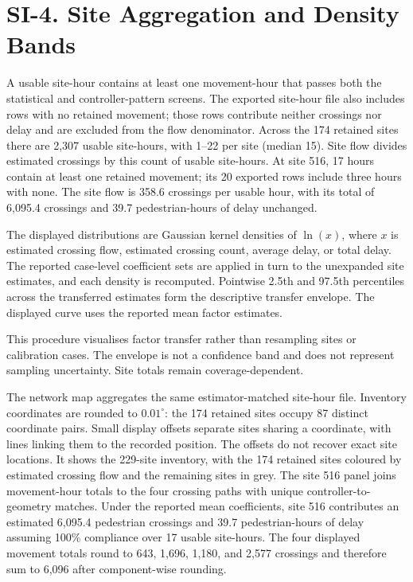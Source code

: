 \documentclass[11pt]{article}
\begin{document}
\section*{SI-4. Site Aggregation and Density Bands}

A usable site-hour contains at least one movement-hour that passes both the statistical and controller-pattern screens. The exported site-hour file also includes rows with no retained movement; those rows contribute neither crossings nor delay and are excluded from the flow denominator. Across the 174 retained sites there are 2,307 usable site-hours, with 1--22 per site (median 15). Site flow divides estimated crossings by this count of usable site-hours. At site 516, 17 hours contain at least one retained movement; its 20 exported rows include three hours with none. The site flow is 358.6 crossings per usable hour, with its total of 6,095.4 crossings and 39.7 pedestrian-hours of delay unchanged.

The displayed distributions are Gaussian kernel densities of $\ln(x)$, where $x$ is estimated crossing flow, estimated crossing count, average delay, or total delay. The reported case-level coefficient sets are applied in turn to the unexpanded site estimates, and each density is recomputed. Pointwise 2.5th and 97.5th percentiles across the transferred estimates form the descriptive transfer envelope. The displayed curve uses the reported mean factor estimates.

This procedure visualises factor transfer rather than resampling sites or calibration cases. The envelope is not a confidence band and does not represent sampling uncertainty. Site totals remain coverage-dependent. %

The network map aggregates the same estimator-matched site-hour file. Inventory coordinates are rounded to $0.01^{\circ}$: the 174 retained sites occupy 87 distinct coordinate pairs. Small display offsets separate sites sharing a coordinate, with lines linking them to the recorded position. The offsets do not recover exact site locations. It shows the 229-site inventory, with the 174 retained sites coloured by estimated crossing flow and the remaining sites in grey. The site 516 panel joins movement-hour totals to the four crossing paths with unique controller-to-geometry matches. Under the reported mean coefficients, site 516 contributes an estimated 6,095.4 pedestrian crossings and 39.7 pedestrian-hours of delay assuming 100\% compliance over 17 usable site-hours. The four displayed movement totals round to 643, 1,696, 1,180, and 2,577 crossings and therefore sum to 6,096 after component-wise rounding. %
\end{document}

